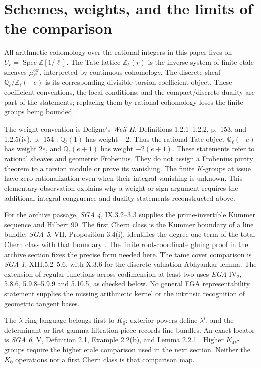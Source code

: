 \section{Schemes, weights, and the limits of the comparison}
\label{sec:framework}

All arithmetic cohomology over the rational integers in this paper lives on
$U_\ell=\operatorname{Spec}\mathbb Z[1/\ell]$. The Tate lattice
$\mathbb Z_\ell(r)$ is the inverse system of finite etale sheaves
$\mu_{\ell^n}^{\otimes r}$, interpreted by continuous cohomology.
The discrete sheaf $\mathbb Q_\ell/\mathbb Z_\ell(-e)$ is its corresponding
divisible torsion coefficient object. These coefficient conventions,
the local conditions, and the compact/discrete duality are part of the
statements; replacing them by rational cohomology loses the finite groups
being bounded.

The weight convention is Deligne's \emph{Weil II}, Definitions 1.2.1--1.2.2,
p.~153, and 1.2.5(iv), p.~154 \cite{DeligneWeilII}: $\mathbb Q_\ell(1)$ has weight $-2$.
Thus the rational Tate object $\mathbb Q_\ell(-e)$ has weight $2e$,
and $\mathbb Q_\ell(e+1)$ has weight $-2(e+1)$. These statements refer
to rational sheaves and geometric Frobenius. They do not assign a
Frobenius purity theorem to a torsion module or prove its vanishing.
The finite $K$-groups at issue have zero rationalization even when their
integral vanishing is unknown. This elementary observation explains why
a weight or sign argument requires the additional integral congruence
and duality statements reconstructed above.

For the archive passage, \emph{SGA 4}, IX.3.2--3.3 supplies the
prime-invertible Kummer sequence and Hilbert 90. The first Chern class
is the Kummer boundary of a line bundle; \emph{SGA 5}, VII,
Proposition 3.4(i), identifies the degree-one term of the total Chern
class with that boundary \cite{SGA5}. The finite root-coordinate gluing proof in
the archive section fixes the precise form needed here. The tame
cover comparison is \emph{SGA 1}, XIII.5.2--5.6, with X.3.6 for the
discrete-valuation Abhyankar lemma. The extension of regular functions
across codimension at least two uses \emph{EGA} $\mathrm{IV}_2$,
5.8.6, 5.9.8--5.9.9 and 5.10.5, as checked below. No general FGA
representability statement supplies the missing arithmetic kernel
or the intrinsic recognition of geometric tangent bases.

The $\lambda$-ring language belongs first to $K_0$: exterior powers
define $\lambda^i$, and the determinant or first gamma-filtration
piece records line bundles. An exact locator is \emph{SGA 6}, V,
Definition 2.1, Example 2.2(b), and Lemma 2.2.1 \cite{SGA6}. Higher $K_{4k}$-groups
require the higher etale comparison used in the next section. Neither
the $K_0$ operations nor a first Chern class is that comparison map.

